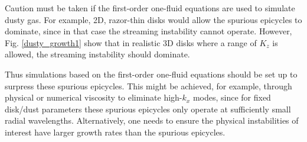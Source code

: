 Caution must be taken if the first-order one-fluid equations are used
to simulate dusty gas. 
For example, 2D, razor-thin disks would allow the spurious epicycles
to dominate, since in that case the streaming instability cannot
operate. However, Fig. \ref{dusty_growth1} show that in realistic 3D
disks where a range of $K_z$ is allowed, the streaming instability
should dominate. 

Thus simulations based on the first-order one-fluid equations should
be set up to surpress these spurious epicycles. This might be
achieved, for example, through physical or numerical viscosity to
eliminate high-$k_x$ modes, since for fixed disk/dust parameters these
spurious epicycles only operate at sufficiently small radial
wavelengths. Alternatively, one needs to ensure the physical
instabilities of interest have larger growth rates than the spurious
epicycles. 









